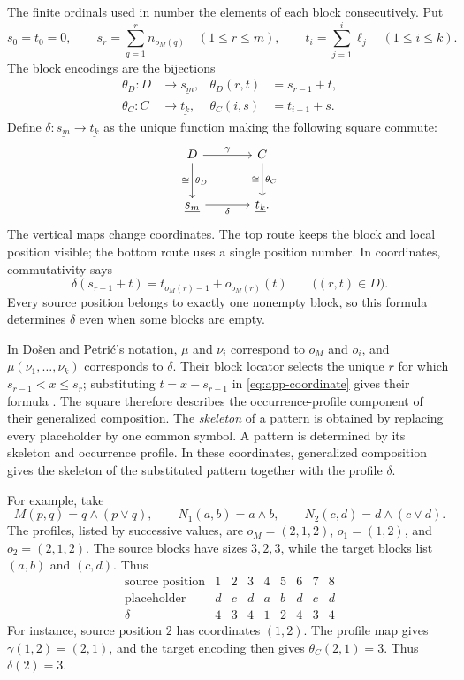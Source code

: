\documentclass[11pt]{article}
\begin{document}
The finite ordinals used in \cite{DP} number the elements of each
block consecutively. Put
\[
 s_0=t_0=0,\qquad
 s_r=\sum_{q=1}^{r}n_{o_M(q)}\quad(1\leq r\leq m),\qquad
 t_i=\sum_{j=1}^{i}\ell_j\quad(1\leq i\leq k).
\]
The block encodings are the bijections
\[
 \begin{aligned}
 \theta_D:D&\longrightarrow\underline{s_m},
       &\theta_D(r,t)&=s_{r-1}+t,\\
 \theta_C:C&\longrightarrow\underline{t_k},
       &\theta_C(i,s)&=t_{i-1}+s.
 \end{aligned}
\]
Define $\delta:\underline{s_m}\to\underline{t_k}$ as the unique
function making the following square commute:
\begin{equation}\label{eq:app-ordinal}
\begin{tikzcd}[column sep=large,row sep=large]
 D\arrow[r,"\gamma"]\arrow[d,"\theta_D","\cong"']
    &C\arrow[d,"\theta_C","\cong"']\\
 \underline{s_m}\arrow[r,"\delta"']&\underline{t_k}.
\end{tikzcd}
\end{equation}
The vertical maps change coordinates. The top route keeps the block
and local position visible; the bottom route uses a single position
number. In coordinates, commutativity says
\begin{equation}\label{eq:app-coordinate}
 \delta(s_{r-1}+t)=t_{o_M(r)-1}+o_{o_M(r)}(t)
 \qquad\bigl((r,t)\in D\bigr).
\end{equation}
Every source position belongs to exactly one nonempty block, so this
formula determines $\delta$ even when some blocks are empty.

In Do\v{s}en and Petri\'c's notation, $\mu$ and $\nu_i$ correspond to
$o_M$ and $o_i$, and $\mu(\nu_1,\ldots,\nu_k)$ corresponds to $\delta$.
Their block locator selects the unique $r$ for which
$s_{r-1}<x\leq s_r$; substituting $t=x-s_{r-1}$ in
\eqref{eq:app-coordinate} gives their formula
\cite[\S2.5, p.~46]{DP}. The square therefore describes the
occurrence-profile component of their generalized composition.
The \emph{skeleton} of a pattern is obtained by replacing every placeholder
by one common symbol. A pattern is determined by its skeleton and
occurrence profile. In these coordinates, generalized composition gives
the skeleton of the substituted pattern together with the profile $\delta$.

For example, take
\[
 M(p,q)=q\wedge(p\vee q),\qquad
 N_1(a,b)=a\wedge b,\qquad
 N_2(c,d)=d\wedge(c\vee d).
\]
The profiles, listed by successive values, are
$o_M=(2,1,2)$, $o_1=(1,2)$, and $o_2=(2,1,2)$.
The source blocks have sizes $3,2,3$, while the target blocks list
$(a,b)$ and $(c,d)$. Thus
\[
\begin{array}{c|ccc|cc|ccc}
 \text{source position}&1&2&3&4&5&6&7&8\\\hline
 \text{placeholder}&d&c&d&a&b&d&c&d\\
 \delta&4&3&4&1&2&4&3&4
\end{array}
\]
For instance, source position $2$ has coordinates $(1,2)$.
The profile map gives $\gamma(1,2)=(2,1)$, and the target encoding
then gives $\theta_C(2,1)=3$. Thus $\delta(2)=3$.
\end{document}
